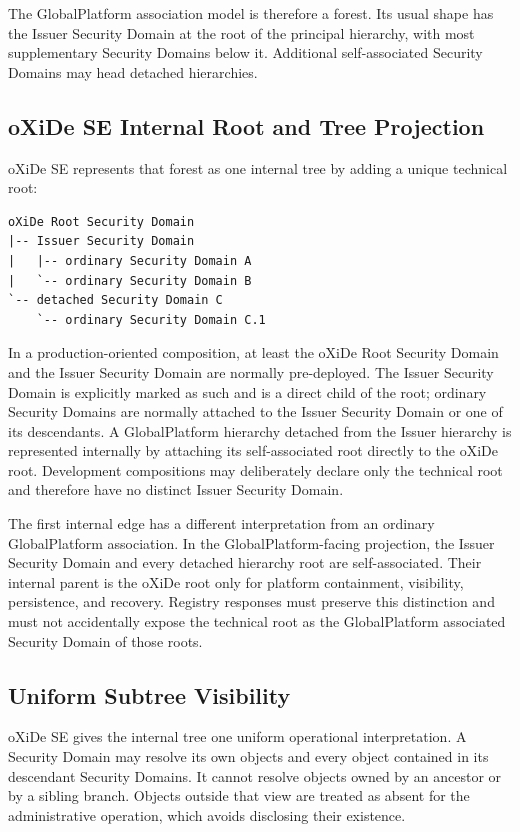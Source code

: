 The GlobalPlatform association model is therefore a forest. Its usual shape
has the Issuer Security Domain at the root of the principal hierarchy, with
most supplementary Security Domains below it. Additional self-associated
Security Domains may head detached hierarchies.

\subsection{oXiDe SE Internal Root and Tree Projection}

oXiDe SE represents that forest as one internal tree by adding a unique
technical root:

\begin{verbatim}
oXiDe Root Security Domain
|-- Issuer Security Domain
|   |-- ordinary Security Domain A
|   `-- ordinary Security Domain B
`-- detached Security Domain C
    `-- ordinary Security Domain C.1
\end{verbatim}

In a production-oriented composition, at least the oXiDe Root Security Domain
and the Issuer Security Domain are normally pre-deployed. The Issuer Security
Domain is explicitly marked as such and is a direct child of the root;
ordinary Security Domains are normally attached to the Issuer Security Domain
or one of its descendants. A GlobalPlatform hierarchy detached from the Issuer
hierarchy is represented internally by attaching its self-associated root
directly to the oXiDe root. Development compositions may deliberately declare
only the technical root and therefore have no distinct Issuer Security Domain.

The first internal edge has a different interpretation from an ordinary
GlobalPlatform association. In the GlobalPlatform-facing projection, the
Issuer Security Domain and every detached hierarchy root are self-associated.
Their internal parent is the oXiDe root only for platform containment,
visibility, persistence, and recovery. Registry responses must preserve this
distinction and must not accidentally expose the technical root as the
GlobalPlatform associated Security Domain of those roots.

\subsection{Uniform Subtree Visibility}

oXiDe SE gives the internal tree one uniform operational interpretation. A
Security Domain may resolve its own objects and every object contained in its
descendant Security Domains. It cannot resolve objects owned by an ancestor or
by a sibling branch. Objects outside that view are treated as absent for the
administrative operation, which avoids disclosing their existence.

